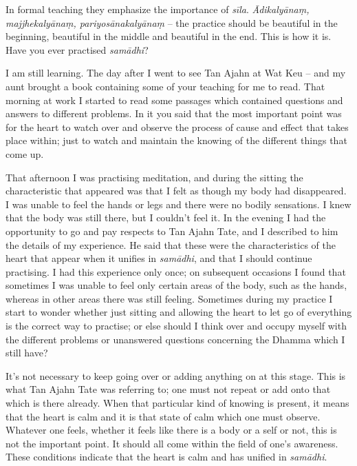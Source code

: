In formal teaching they emphasize the importance of \emph{sīla}. 
\emph{Ādikalyānaṃ, majjhekalyānaṃ, pariyosānakalyānaṃ} -- the practice should
be beautiful in the beginning, beautiful in the middle and beautiful in
the end. This is how it is. Have you ever practised \emph{samādhi}? 

\question{}
I am still learning. The day after I went to see Tan Ajahn at Wat
Keu -- and my aunt brought a book containing some of your teaching for me
to read. That morning at work I started to read some passages which
contained questions and answers to different problems. In it you said
that the most important point was for the heart to watch over and
observe the process of cause and effect that takes place within; just to
watch and maintain the knowing of the different things that come up. 

That afternoon I was practising meditation, and during the sitting the
characteristic that appeared was that I felt as though my body had
disappeared. I was unable to feel the hands or legs and there were no
bodily sensations. I knew that the body was still there, but I couldn't
feel it. In the evening I had the opportunity to go and pay respects to
Tan Ajahn Tate, and I described to him the details of my experience. He
said that these were the characteristics of the heart that appear when
it unifies in \emph{samādhi}, and that I should continue practising. I
had this experience only once; on subsequent occasions I found that
sometimes I was unable to feel only certain areas of the body, such as
the hands, whereas in other areas there was still feeling. Sometimes
during my practice I start to wonder whether just sitting and allowing
the heart to let go of everything is the correct way to practise; or
else should I think over and occupy myself with the different problems
or unanswered questions concerning the Dhamma which I still have? 

It's not necessary to keep going over or adding anything
on at this stage. This is what Tan Ajahn Tate was referring to; one must
not repeat or add onto that which is there already. When that particular
kind of knowing is present, it means that the heart is calm and it is
that state of calm which one must observe. Whatever one feels, whether
it feels like there is a body or a self or not, this is not the
important point. It should all come within the field of one's awareness. 
These conditions indicate that the heart is calm and has unified in
\emph{samādhi}. 


